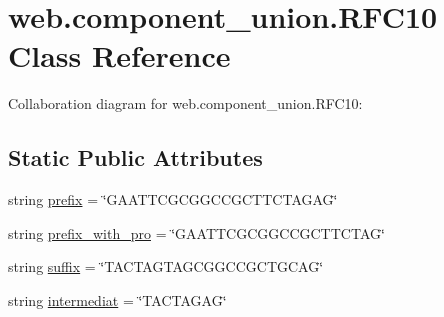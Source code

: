 \hypertarget{classweb_1_1component__union_1_1_r_f_c10}{\section{web.\-component\-\_\-union.\-R\-F\-C10 Class Reference}
\label{classweb_1_1component__union_1_1_r_f_c10}
}


Collaboration diagram for web.\-component\-\_\-union.\-R\-F\-C10\-:
\subsection*{Static Public Attributes}
\begin{DoxyCompactItemize}
\item 
string \hyperlink{classweb_1_1component__union_1_1_r_f_c10_a1d6b141c104e00fbca5eec8fbe28f32b}{prefix} = \char`\"{}G\-A\-A\-T\-T\-C\-G\-C\-G\-G\-C\-C\-G\-C\-T\-T\-C\-T\-A\-G\-A\-G\char`\"{}
\item 
string \hyperlink{classweb_1_1component__union_1_1_r_f_c10_a0fbd566518fac8b5840641dd4d024860}{prefix\-\_\-with\-\_\-pro} = \char`\"{}G\-A\-A\-T\-T\-C\-G\-C\-G\-G\-C\-C\-G\-C\-T\-T\-C\-T\-A\-G\char`\"{}
\item 
string \hyperlink{classweb_1_1component__union_1_1_r_f_c10_ac2650362ac0e37bbe76d7d2ca7c34d0a}{suffix} = \char`\"{}T\-A\-C\-T\-A\-G\-T\-A\-G\-C\-G\-G\-C\-C\-G\-C\-T\-G\-C\-A\-G\char`\"{}
\item 
string \hyperlink{classweb_1_1component__union_1_1_r_f_c10_adb75408ad665c2677622cc29c836af11}{intermediat} = \char`\"{}T\-A\-C\-T\-A\-G\-A\-G\char`\"{}
\end{DoxyCompactItemize}


